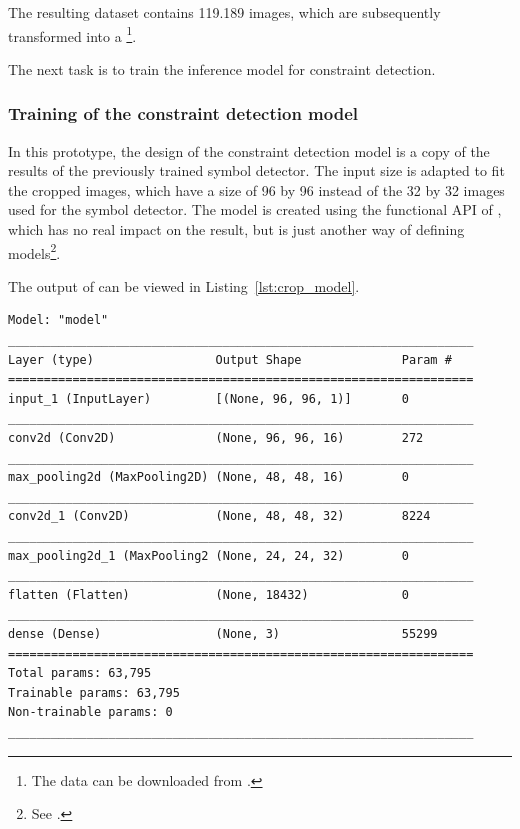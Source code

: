 The resulting dataset contains 119.189 images, which are subsequently transformed into a \footnote{The data can be downloaded from .}.

The next task is to train the inference model for constraint detection.

\subsubsection{Training of the constraint detection model}

In this prototype, the design of the constraint detection model is a copy of the results of the previously trained symbol detector.
The input size is adapted to fit the cropped images, which have a size of 96 by 96 instead of the 32 by 32 images used for the symbol detector.
The model is created using the functional API of , which has no real impact on the result, but is just another way of defining models\footnote{See .}.

The output of  can be viewed in Listing~\ref{lst:crop_model}.
\begin{lstlisting}[label={lst:crop_model}, caption={Summary of Constraint Detector.}]
Model: "model"
_________________________________________________________________
Layer (type)                 Output Shape              Param #   
=================================================================
input_1 (InputLayer)         [(None, 96, 96, 1)]       0         
_________________________________________________________________
conv2d (Conv2D)              (None, 96, 96, 16)        272       
_________________________________________________________________
max_pooling2d (MaxPooling2D) (None, 48, 48, 16)        0         
_________________________________________________________________
conv2d_1 (Conv2D)            (None, 48, 48, 32)        8224      
_________________________________________________________________
max_pooling2d_1 (MaxPooling2 (None, 24, 24, 32)        0         
_________________________________________________________________
flatten (Flatten)            (None, 18432)             0         
_________________________________________________________________
dense (Dense)                (None, 3)                 55299     
=================================================================
Total params: 63,795
Trainable params: 63,795
Non-trainable params: 0
_________________________________________________________________    
\end{lstlisting}

